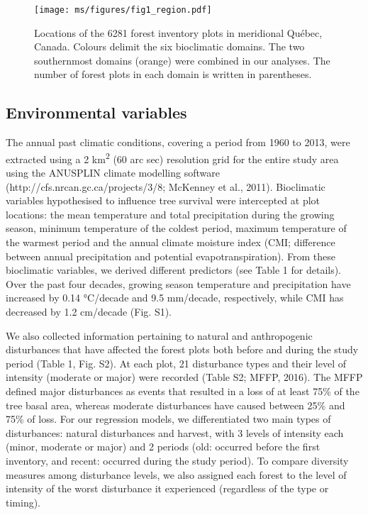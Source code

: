 \documentclass[
  a4paperpaper,
]{article}
\begin{document}
\begin{figure}
\centering
\texttt{[image: ms/figures/fig1\_region.pdf]}
\caption{Locations of the 6281 forest inventory plots in meridional
Québec, Canada. Colours delimit the six bioclimatic domains. The two
southernmost domains (orange) were combined in our analyses. The number
of forest plots in each domain is written in parentheses.}
\end{figure}

\hypertarget{environmental-variables}{%
\subsection{Environmental variables}\label{environmental-variables}}

The annual past climatic conditions, covering a period from 1960 to
2013, were extracted using a 2 km\textsuperscript{2} (60 arc sec)
resolution grid for the entire study area using the ANUSPLIN climate
modelling software (http://cfs.nrcan.gc.ca/projects/3/8; McKenney et
al., 2011). Bioclimatic variables hypothesised to influence tree
survival were intercepted at plot locations: the mean temperature and
total precipitation during the growing season, minimum temperature of
the coldest period, maximum temperature of the warmest period and the
annual climate moisture index (CMI; difference between annual
precipitation and potential evapotranspiration). From these bioclimatic
variables, we derived different predictors (see Table 1 for details).
Over the past four decades, growing season temperature and precipitation
have increased by 0.14 °C/decade and 9.5 mm/decade, respectively, while
CMI has decreased by 1.2 cm/decade (Fig. S1).

We also collected information pertaining to natural and anthropogenic
disturbances that have affected the forest plots both before and during
the study period (Table 1, Fig. S2). At each plot, 21 disturbance types
and their level of intensity (moderate or major) were recorded (Table
S2; MFFP, 2016). The MFFP defined major disturbances as events that
resulted in a loss of at least 75\% of the tree basal area, whereas
moderate disturbances have caused between 25\% and 75\% of loss. For our
regression models, we differentiated two main types of disturbances:
natural disturbances and harvest, with 3 levels of intensity each
(minor, moderate or major) and 2 periods (old: occurred before the first
inventory, and recent: occurred during the study period). To compare
diversity measures among disturbance levels, we also assigned each
forest to the level of intensity of the worst disturbance it experienced
(regardless of the type or timing).
\end{document}
